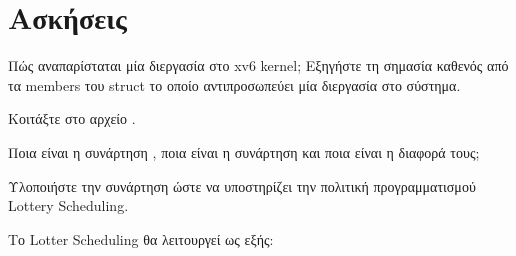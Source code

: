 \documentclass[18pt]{extarticle}
\begin{document}
\section{Ασκήσεις}

\begin{question}
    Πώς αναπαρίσταται μία διεργασία στο xv6 kernel;
    Εξηγήστε τη σημασία καθενός από τα members του struct 
    το οποίο αντιπροσωπεύει μία διεργασία στο σύστημα.

    \begin{info}[Σημείωση:]
        Κοιτάξτε στο αρχείο .
    \end{info}
\end{question}

\begin{question}
    Ποια είναι η συνάρτηση , ποια είναι η συνάρτηση  και ποια είναι η διαφορά τους;
\end{question}

\begin{question}
    Υλοποιήστε την συνάρτηση  ώστε να υποστηρίζει την πολιτική προγραμματισμού Lottery Scheduling.

    Το Lotter Scheduling θα λειτουργεί ως εξής:

\end{question}

\printbibliography
\end{document}
